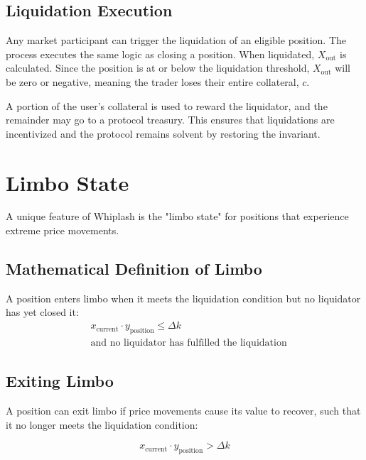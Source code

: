\documentclass[11pt]{article}
\begin{document}
\subsection{Liquidation Execution}

Any market participant can trigger the liquidation of an eligible position. The process executes the same logic as closing a position. When liquidated, $X_{\text{out}}$ is calculated. Since the position is at or below the liquidation threshold, $X_{\text{out}}$ will be zero or negative, meaning the trader loses their entire collateral, $c$.

A portion of the user's collateral is used to reward the liquidator, and the remainder may go to a protocol treasury. This ensures that liquidations are incentivized and the protocol remains solvent by restoring the invariant.

\section{Limbo State}

A unique feature of Whiplash is the "limbo state" for positions that experience extreme price movements.

\subsection{Mathematical Definition of Limbo}

A position enters limbo when it meets the liquidation condition but no liquidator has yet closed it:
\begin{equation}
\begin{aligned}
&x_{\text{current}} \cdot y_{\text{position}} \le \Delta k \\
&\text{and no liquidator has fulfilled the liquidation}
\end{aligned}
\end{equation}

\subsection{Exiting Limbo}

A position can exit limbo if price movements cause its value to recover, such that it no longer meets the liquidation condition:

\begin{equation}
x_{\text{current}} \cdot y_{\text{position}} > \Delta k
\end{equation}
\end{document}

